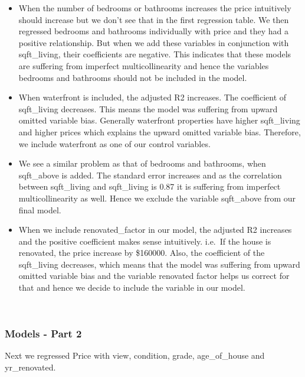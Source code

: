 \documentclass[
]{article}
\begin{document}
\begin{itemize}
\item
  When the number of bedrooms or bathrooms increases the price
  intuitively should increase but we don't see that in the first
  regression table. We then regressed bedrooms and bathrooms
  individually with price and they had a positive relationship. But when
  we add these variables in conjunction with sqft\_living, their
  coefficients are negative. This indicates that these models are
  suffering from imperfect multicollinearity and hence the variables
  bedrooms and bathrooms should not be included in the model.
\item
  When waterfront is included, the adjusted R2 increases. The
  coefficient of sqft\_living decreases. This means the model was
  suffering from upward omitted variable bias. Generally waterfront
  properties have higher sqft\_living and higher prices which explains
  the upward omitted variable bias. Therefore, we include waterfront as
  one of our control variables.
\item
  We see a similar problem as that of bedrooms and bathrooms, when
  sqft\_above is added. The standard error increases and as the
  correlation between sqft\_living and sqft\_living is 0.87 it is
  suffering from imperfect multicollinearity as well. Hence we exclude
  the variable sqft\_above from our final model.
\item
  When we include renovated\_factor in our model, the adjusted R2
  increases and the positive coefficient makes sense intuitively.
  i.e.~If the house is renovated, the price increase by \$160000. Also,
  the coefficient of the sqft\_living decreases, which means that the
  model was suffering from upward omitted variable bias and the variable
  renovated factor helps us correct for that and hence we decide to
  include the variable in our model.
\end{itemize}

~

\hypertarget{models---part-2}{%
\subsubsection{Models - Part 2}\label{models---part-2}}

Next we regressed Price with view, condition, grade, age\_of\_house and
yr\_renovated.
\end{document}
